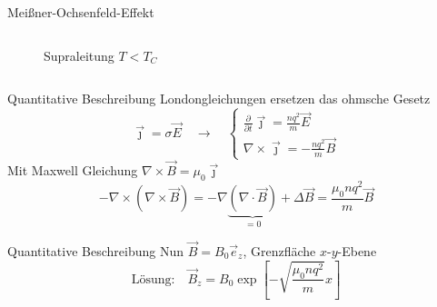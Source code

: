 \begin{frame}{Meißner-Ochsenfeld-Effekt}
\begin{columns}
\begin{column}{0.49\textwidth}
\begin{figure}
    \caption{Supraleitung $T < T_{C}$}
    \label{fig: bfeld_supraleitung}
  \end{figure}
\end{column}
\end{columns}
\end{frame}

\begin{frame}{Quantitative Beschreibung}
Londongleichungen ersetzen das ohmsche Gesetz
\begin{equation}
  \vec{\jmath} = \sigma \vec{E}\quad  \longrightarrow \quad
  \begin{cases}
    \frac{\partial }{\partial t}\vec{\jmath} = \frac{nq^2}{m}\vec{E} \\
    \nabla \times \vec{\jmath} = - \frac{n q^2}{m} \vec{B}
  \end{cases}
\end{equation}
\pause
Mit Maxwell Gleichung $\nabla \times \vec{B} = \mu_0 \vec{\jmath}$
\begin{equation}
-\nabla \times (\nabla \times \vec{B}) = -\nabla\underbrace{(\nabla \cdot \vec{B})}_{= 0} + \Delta \vec{B} = \frac{\mu_0 n q^2}{m}\vec{B}
\end{equation}
\end{frame}

\begin{frame}{Quantitative Beschreibung}
Nun $\vec{B} = B_0 \vec{e}_z$, Grenzfläche $x$-$y$-Ebene
\begin{equation}
  \text{Lösung:}\quad \vec{B}_z = B_0 \exp[- \sqrt{\frac{\mu_0 n q^2}{m}}   x ]
\end{equation}
\end{frame}
